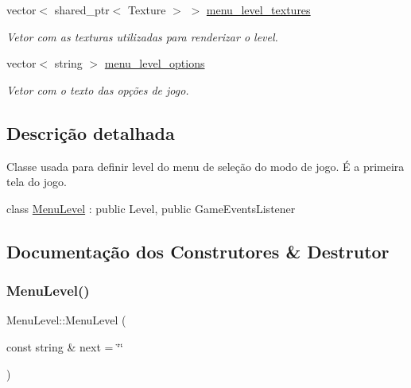 \begin{DoxyCompactItemize}
\mbox{\label{classMenuLevel_a86bfd7ddf73258b6b322cbe9731b52d2}} 
vector$<$ shared\+\_\+ptr$<$ Texture $>$ $>$ \mbox{\hyperlink{classMenuLevel_a86bfd7ddf73258b6b322cbe9731b52d2}{menu\+\_\+level\+\_\+textures}}
\begin{DoxyCompactList}\small\item\em Vetor com as texturas utilizadas para renderizar o level. \end{DoxyCompactList}\item 
\mbox{\label{classMenuLevel_a2f6e3ee1e2fa7436f788d4b771f4dd36}} 
vector$<$ string $>$ \mbox{\hyperlink{classMenuLevel_a2f6e3ee1e2fa7436f788d4b771f4dd36}{menu\+\_\+level\+\_\+options}}
\begin{DoxyCompactList}\small\item\em Vetor com o texto das opções de jogo. \end{DoxyCompactList}\end{DoxyCompactItemize}


\subsection{Descrição detalhada}
Classe usada para definir level do menu de seleção do modo de jogo. É a primeira tela do jogo. 

class \mbox{\hyperlink{classMenuLevel}{Menu\+Level}} \+: public Level, public Game\+Events\+Listener 

\subsection{Documentação dos Construtores \& Destrutor}
\mbox{\label{classMenuLevel_a207c59fd8fdbb6252bdbbe0d8f73fcf6}} 
\subsubsection{\texorpdfstring{Menu\+Level()}{MenuLevel()}}
{\footnotesize\ttfamily Menu\+Level\+::\+Menu\+Level (\begin{DoxyParamCaption}\item[{const string \&}]{next = {\ttfamily \char`\"{}\char`\"{}} }\end{DoxyParamCaption})}



